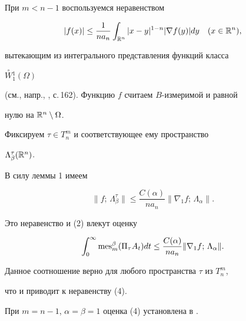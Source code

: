 \begin{pf} При $m<n-1$ воспользуемся неравенством 


$$ 


|f(x)|\le \frac{1}{na_n}\int_{\Bbb R^n}|x-y|^{1-n} 


|\nabla f(y)|dy \quad (x\in\Bbb R^n), 


$$ 


вытекающим из интегрального представления функций класса 


$\overset{\circ}{W}{}^1_1(\Omega)$ 


(см., напр., \cite{Sol}, с.\,162). Функцию $f$ считаем $B$-измеримой и равной 


нулю на $\Bbb R^n\setminus\Omega$. 


Фиксируем $\tau\in T^m_n$ и соответствующее ему пространство 


$\Lambda_\beta^\tau(\Bbb R^n)$. 


В силу леммы 1 имеем 


$$ 


\|f;\,\Lambda^\tau_\beta\| \le \frac{C(\alpha)}{na_n} 


\|\nabla_1f;\,\Lambda_\alpha\|. 


$$ 


Это неравенство и (2) влекут оценку 


$$ 


\int_0^\infty\mes_m^\beta(\Pi_\tau A_t)dt \le 


\frac{C(\alpha)}{na_n}\|\nabla_1 f;\,\Lambda_\alpha\|. 


$$ 


Данное соотношение верно для любого пространства $\tau$ из $T^m_n$, 


что и приводит к неравенству (4). 


 


При $m=n-1$, $\alpha=\beta=1$ оценка (4) установлена в \cite{Kli1}. 


\end{pf} 


 




